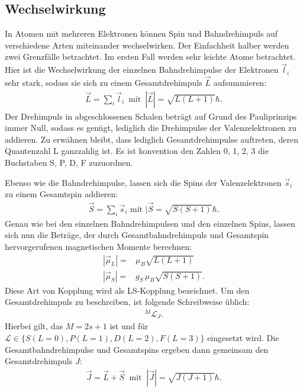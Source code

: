 \subsection{Wechselwirkung}
\noindent In Atomen mit mehreren Elektronen können Spin und Bahndrehimpuls auf
verschiedene Arten miteinander wechselwirken.
Der Einfachheit halber werden zwei Grenzfälle betrachtet.
Im ersten Fall werden sehr leichte Atome betrachtet. Hier ist die Wechselwirkung
der einzelnen Bahndrehimpulse der Elektronen $\vec{l}_i$ sehr stark, sodass sie sich zu
einem Gesamtdrehimpuls $\vec{L}$ aufsummieren:
\FloatBarrier
\begin{align*}
    \vec{L} = \sum_i \vec{l}_i\, \text{ mit }\, |\vec{L}|=\sqrt{L(L+1)}\hbar.
\end{align*}
Der Drehimpuls in abgeschlossenen Schalen beträgt auf Grund des
Pauliprinzips immer Null, sodass es genügt, lediglich die Drehimpulse der Valenzelektronen
zu addieren.
Zu erwähnen bleibt, dass lediglich Gesamtdrehimpulse auftreten, deren Quantenzahl L
ganzzahlig ist. Es ist konvention den Zahlen 0, 1, 2, 3 die Buchstaben S, P, D, F zuzuordnen.

\noindent Ebenso wie die Bahndrehimpulse, lassen sich die Spins der Valenzelektronen $\vec{s}_i$
zu einem Gesamtspin addieren:
\begin{align*}
    \vec{S} = \sum_i \vec{s}_i \text{ mit } |\vec{S}=\sqrt{S(S+1)}\hbar.
\end{align*}
Genau wie bei den einzelnen Bahndrehimpulsen und den einzelnen Spins, lassen sich
nun die Beträge, der durch Gesamtbahndrehimpuls und Gesamtspin hervorgerufenen magnetischen
Momente berechnen:
\begin{align*}
    |\vec{\mu}_L| =& \mu_B\sqrt{L(L+1)} \\
    |\vec{\mu}_S| =& g_S \, \mu_B\sqrt{S(S+1)}.
\end{align*}
Diese Art von Kopplung wird als LS-Kopplung bezeichnet.
Um den Gesamtdrehimpuls zu beschreiben, ist folgende Schreibweise üblich:
\begin{align*}
    {}^M\mathcal{L}_J.
\end{align*}
Hierbei gilt, das $M=2s+1$ ist und für $\mathcal{L}\in\{S(L=0), P(L=1), D(L=2), F(L=3)\}$
eingesetzt wird.
Die Gesamtbahndrehimpulse und Gesamtspins ergeben dann gemeinsam den Gesamtdrehimpuls $J$:
\begin{align*}
    \vec{J}=\vec{L}+\vec{S} \ \text{ mit }\ |\vec{J}|=\sqrt{J(J+1)}\hbar.
\end{align*}

